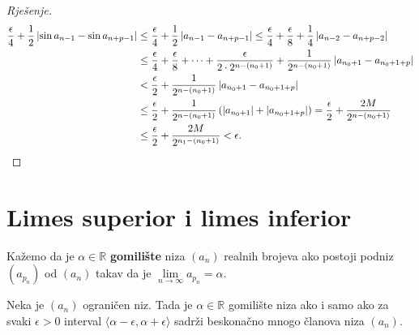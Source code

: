 \begin{proof}[Rješenje]
\begin{align*}
\dfrac{\epsilon}{4}+\dfrac{1}{2}\left\lvert\sin{a_{n-1}-\sin{a_{n+p-1}}}\right\rvert&\leq \dfrac{\epsilon}{4}+\dfrac{1}{2}\left\lvert a_{n-1}-a_{n+p-1}\right\rvert\leq \dfrac{\epsilon}{4}+\dfrac{\epsilon}{8}+\dfrac{1}{4}\left\lvert a_{n-2}-a_{n+p-2}\right\rvert\\
&\leq \dfrac{\epsilon}{4}+\dfrac{\epsilon}{8}+\dots+\dfrac{\epsilon}{2\cdot 2^{n-(n_0+1)}}+\dfrac{1}{2^{n-(n_0+1)}}\left\lvert a_{n_0+1}-a_{n_0+1+p}\right\rvert\\
&<\dfrac{\epsilon}{2}+\dfrac{1}{2^{n-(n_0+1)}}\left\lvert a_{n_0+1}-a_{n_0+1+p}\right\rvert\\
&\leq \dfrac{\epsilon}{2}+\dfrac{1}{2^{n-(n_0+1)}}\left(\left\lvert a_{n_0+1}\right\rvert+\left\lvert a_{n_0+1+p}\right\rvert\right)=\dfrac{\epsilon}{2}+\dfrac{2M}{2^{n-(n_0+1)}}\\
&\leq \dfrac{\epsilon}{2}+\dfrac{2M}{2^{n_1-(n_0+1)}}<\epsilon. \qedhere
\end{align*}
\end{proof}
\section{Limes superior i limes inferior}
\begin{definition}
Kažemo da je \(\alpha\in \mathbb{R}\) \textbf{gomilište} niza \((a_n)\) realnih brojeva ako postoji podniz \((a_{p_n})\) od \((a_n)\) takav da je \(\lim\limits_{n\to \infty}{a_{p_n}}=\alpha\).
\end{definition}

\begin{remark} Neka je \((a_n)\) ograničen niz. Tada je \(\alpha\in \mathbb{R}\) gomilište niza ako i samo ako za svaki \(\epsilon>0\) interval \(\langle \alpha-\epsilon, \alpha+\epsilon\rangle\) sadrži beskonačno mnogo članova niza \((a_n)\).
\end{remark}


